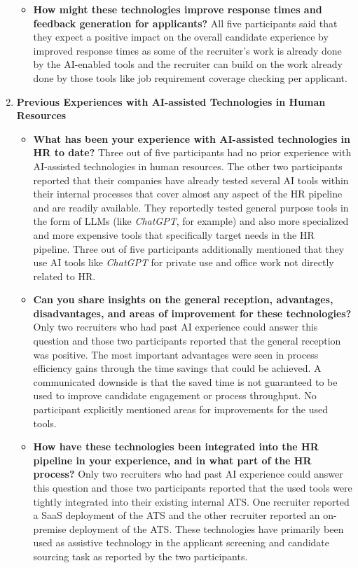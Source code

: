 \documentclass[draft,final]{thesisclass} %
\begin{document}
\begin{enumerate}
\begin{itemize}
        \item \textbf{How might these technologies improve response times and feedback generation for applicants?}
        All five participants said that they expect a positive impact on the overall candidate experience by improved response times as some of the recruiter's work is already done by the \acs{AI}-enabled tools and the recruiter can build on the work already done by those tools like job requirement coverage checking per applicant.
    \end{itemize}
    \item \textbf{Previous Experiences with \acs{AI}-assisted Technologies in Human Resources}
    \begin{itemize}
        \item \textbf{What has been your experience with \acs{AI}-assisted technologies in \acs{HR} to date?}
        Three out of five participants had no prior experience with \acs{AI}-assisted technologies in human resources. The other two participants reported that their companies have already tested several \acs{AI} tools within their internal processes that cover almost any aspect of the \acs{HR} pipeline and are readily available. They reportedly tested general purpose tools in the form of \acs{LLM}s (like \textit{ChatGPT}, for example) and also more specialized and more expensive tools that specifically target needs in the \acs{HR} pipeline. Three out of five participants additionally mentioned that they use \acs{AI} tools like \textit{ChatGPT} for private use and office work not directly related to \acs{HR}.
        \item \textbf{Can you share insights on the general reception, advantages, disadvantages, and areas of improvement for these technologies?}
        Only two recruiters who had past \acs{AI} experience could answer this question and those two participants reported that the general reception was positive. The most important advantages were seen in process efficiency gains through the time savings that could be achieved. A communicated downside is that the saved time is not guaranteed to be used to improve candidate engagement or process throughput. No participant explicitly mentioned areas for improvements for the used tools.
        \item \textbf{How have these technologies been integrated into the \acs{HR} pipeline in your experience, and in what part of the \acs{HR} process?}
        Only two recruiters who had past \acs{AI} experience could answer this question and those two participants reported that the used tools were tightly integrated into their existing internal \acs{ATS}. One recruiter reported a \acs{SaaS} deployment of the \acs{ATS} and the other recruiter reported an on-premise deployment of the \acs{ATS}. These technologies have primarily been used as assistive technology in the applicant screening and candidate sourcing task as reported by the two participants.

\end{itemize}
\end{enumerate}
\end{document}
